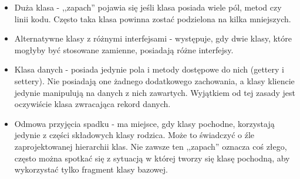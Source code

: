 \begin{itemize}
	\item Duża klasa - ,,zapach'' pojawia się jeśli klasa posiada wiele pól, metod czy linii kodu. Często taka klasa powinna zostać podzielona na kilka mniejszych.
	\item Alternatywne klasy z różnymi interfejsami - występuje, gdy dwie klasy, które mogłyby być stosowane zamienne, posiadają różne interfejsy. 
	\item Klasa danych - posiada jedynie pola i metody dostępowe do nich (gettery i settery). Nie posiadają one żadnego dodatkowego zachowania, a klasy kliencie jedynie manipulują na danych z nich zawartych. Wyjątkiem od tej zasady jest oczywiście klasa zwracająca rekord danych.  
	\item Odmowa przyjęcia spadku - ma miejsce, gdy klasy pochodne, korzystają jedynie z części składowych klasy rodzica. Może to świadczyć o źle zaprojektowanej hierarchii klas. Nie zawsze ten ,,zapach'' oznacza coś złego, często można spotkać się z sytuacją w której tworzy się klasę pochodną, aby wykorzystać tylko fragment klasy bazowej. 
\end{itemize}

